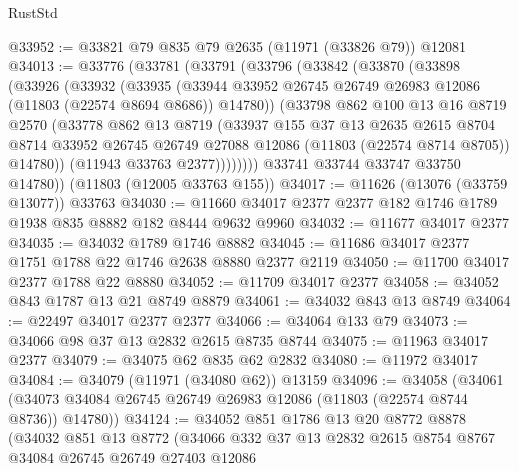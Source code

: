 \begin{lexlean}{RustStd}
\begin{coremodule}
@33952 := @33821 @79 @835 @79 @2635 (@11971 (@33826 @79)) @12081
@34013 := @33776
    (@33781
      (@33791
        (@33796
          (@33842
            (@33870
              (@33898
                (@33926
                  (@33932
                    (@33935
                      (@33944
                        @33952
                        @26745
                        @26749
                        @26983
                        @12086
                        (@11803 (@22574 @8694 @8686))
                        @14780))
                    (@33798
                      @862
                      @100
                      @13
                      @16
                      @8719
                      @2570
                      (@33778
                        @862
                        @13
                        @8719
                        (@33937
                          @155
                          @37
                          @13
                          @2635
                          @2615
                          @8704
                          @8714
                          @33952
                          @26745
                          @26749
                          @27088
                          @12086
                          (@11803 (@22574 @8714 @8705))
                          @14780))
                      (@11943 @33763 @2377))))))))
        @33741
        @33744
        @33747
        @33750
        @14780))
    (@11803 (@12005 @33763 @155))
@34017 := @11626 (@13076 (@33759 @13077)) @33763
@34030 := @11660 @34017 @2377 @2377 @182 @1746 @1789 @1938 @835 @8882 @182 @8444 @9632 @9960
@34032 := @11677 @34017 @2377
@34035 := @34032 @1789 @1746 @8882
@34045 := @11686 @34017 @2377 @1751 @1788 @22 @1746 @2638 @8880 @2377 @2119
@34050 := @11700 @34017 @2377 @1788 @22 @8880
@34052 := @11709 @34017 @2377
@34058 := @34052 @843 @1787 @13 @21 @8749 @8879
@34061 := @34032 @843 @13 @8749
@34064 := @22497 @34017 @2377 @2377
@34066 := @34064 @133 @79
@34073 := @34066 @98 @37 @13 @2832 @2615 @8735 @8744
@34075 := @11963 @34017 @2377
@34079 := @34075 @62 @835 @62 @2832
@34080 := @11972 @34017
@34084 := @34079 (@11971 (@34080 @62)) @13159
@34096 := @34058
    (@34061 (@34073 @34084 @26745 @26749 @26983 @12086 (@11803 (@22574 @8744 @8736)) @14780))
@34124 := @34052
    @851
    @1786
    @13
    @20
    @8772
    @8878
    (@34032
      @851
      @13
      @8772
      (@34066
        @332
        @37
        @13
        @2832
        @2615
        @8754
        @8767
        @34084
        @26745
        @26749
        @27403
        @12086

\end{coremodule}
\end{lexlean}
